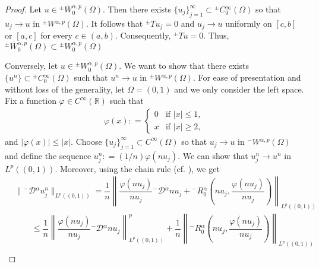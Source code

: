 \documentclass[leqno,final]{siamltex}
\numberwithin{equation}{section}
\renewcommand{\(}{\bigl(}
\renewcommand{\)}{\bigr)}
\newcommand{\R}{\mathbb{R}}
\begin{document}
    \begin{proof}
        Let $u \in {^{\pm}}{\overline{W}}{^{\alpha,p}_{0}}(\Omega)$. Then there exists $\{u_j\}_{j=1}^{\infty} \subset {^{\pm}}{C}{^{\infty}_{0}}(\Omega)$ so that $u_j \rightarrow u$ in ${^{\pm}}{W}{^{\alpha,p}}(\Omega)$. 
        It follows that ${^{\pm}}{T} u_j = 0$ and $u_j \rightarrow u$ uniformly on $[c,b]$ or $[a,c]$ for every
        $c\in (a,b)$. Consequently, ${^{\pm}}{T} u = 0$. Thus, $ {^{\pm}}{\overline{W}}{^{\alpha , p}_{0}}(\Omega)\subset {^{\pm}}{W}{^{\alpha,p}_{0}}(\Omega)$

        Conversely, let $u \in {^{\pm}}{W}{^{\alpha,p}_{0}}(\Omega)$. We want to show that there exists $\{u^n\} \subset {^{\pm}}{C}{^{\infty}_{0}}(\Omega)$ such that $u^n \rightarrow u$ in ${^{\pm}}{W}{^{\alpha,p}}(\Omega)$. 
        For ease of presentation and without loss of the generality, let $\Omega = (0,1)$ and we only consider the left 
        space. Fix a function $\varphi \in C^{\infty}(\R)$ such that 
        \begin{align*}
            \varphi(x) : = \begin{cases} 0 &\text{if } |x| \leq 1, \\ 
            x &\text{if } |x| \geq 2,
            \end{cases}
        \end{align*}
        and $|\varphi(x)| \leq |x|$. Choose $\{u_j\}_{j=1}^{\infty} \subset C^{\infty}(\Omega)$ so that $u_j \rightarrow u$ in ${^{-}}{W}{^{\alpha,p}}(\Omega)$ and define the sequence $u^{n}_{j} : = (1/n) \varphi(nu_j)$. We can show that $u^{n}_{j} \rightarrow u^n$ in $L^{p}((0,1))$. Moreover, using the chain rule (cf. \cite[Theorem 4.4]{Feng_Sutton}),
        we get
        \begin{align*}
            &\|{^{-}}{\mathcal{D}}{^{\alpha}} u^{n}_{j}\|_{L^{p}((0,1))}
            = \dfrac{1}{n} \left\| \dfrac{\varphi(nu_j)}{nu_j} {^{-}}{\mathcal{D}}{^{\alpha}} nu_j + {^{-}}{R}{^{\alpha}_{0}} \left(nu_j , \dfrac{\varphi(nu_j)}{nu_j}\right) \right\|_{L^{p}((0,1))}\\
            &\qquad \leq \dfrac{1}{n} \left\|\dfrac{\varphi(nu_j)}{nu_j} {^{-}}{\mathcal{D}}{^{\alpha}} nu_j \right\|_{L^{p}((0,1))}^{p} + \dfrac{1}{n} \left\| {^{-}}{R}{^{\alpha}_{0}} \left(nu_j , \dfrac{\varphi(nu_j)}{nu_j}\right) \right\|_{L^{p}((0,1))}\\

\end{align*}
\end{proof}
\end{document}
